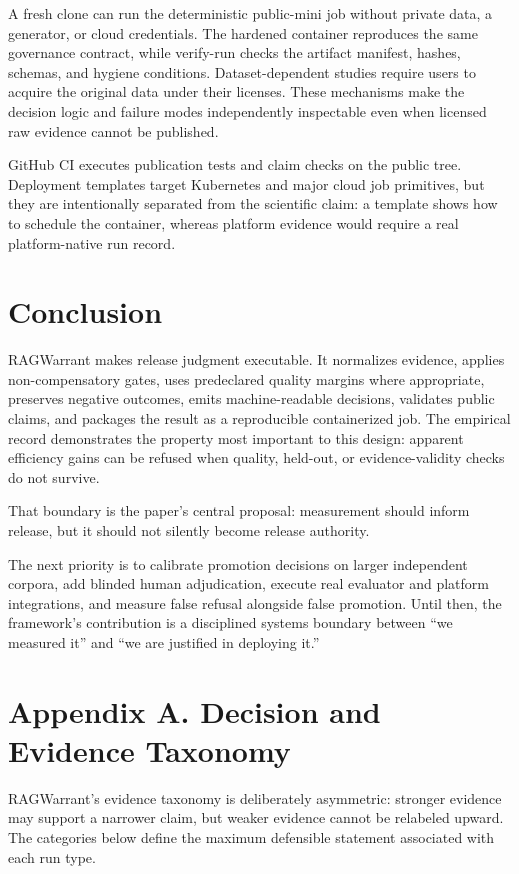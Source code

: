 \documentclass[11pt]{article}
\begin{document}
A fresh clone can run the deterministic public-mini job without private data, a generator, or cloud credentials. The hardened container reproduces the same governance contract, while verify-run checks the artifact manifest, hashes, schemas, and hygiene conditions. Dataset-dependent studies require users to acquire the original data under their licenses. These mechanisms make the decision logic and failure modes independently inspectable even when licensed raw evidence cannot be published.

GitHub CI executes publication tests and claim checks on the public tree. Deployment templates target Kubernetes and major cloud job primitives, but they are intentionally separated from the scientific claim: a template shows how to schedule the container, whereas platform evidence would require a real platform-native run record.

\section{Conclusion}
RAGWarrant makes release judgment executable. It normalizes evidence, applies non-compensatory gates, uses predeclared quality margins where appropriate, preserves negative outcomes, emits machine-readable decisions, validates public claims, and packages the result as a reproducible containerized job. The empirical record demonstrates the property most important to this design: apparent efficiency gains can be refused when quality, held-out, or evidence-validity checks do not survive.

That boundary is the paper's central proposal: measurement should inform release, but it should not silently become release authority.

The next priority is to calibrate promotion decisions on larger independent corpora, add blinded human adjudication, execute real evaluator and platform integrations, and measure false refusal alongside false promotion. Until then, the framework's contribution is a disciplined systems boundary between ``we measured it'' and ``we are justified in deploying it.''

\section{Appendix A. Decision and Evidence Taxonomy}
RAGWarrant's evidence taxonomy is deliberately asymmetric: stronger evidence may support a narrower claim, but weaker evidence cannot be relabeled upward. The categories below define the maximum defensible statement associated with each run type.
\end{document}
